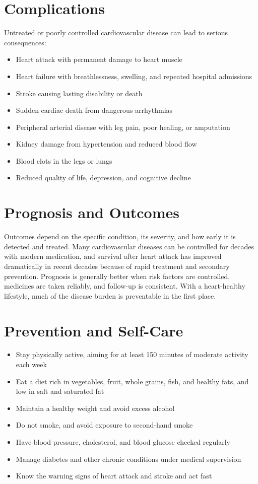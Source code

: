 \section*{Complications}
Untreated or poorly controlled cardiovascular disease can lead to serious consequences:
\begin{itemize}
    \item Heart attack with permanent damage to heart muscle
    \item Heart failure with breathlessness, swelling, and repeated hospital admissions
    \item Stroke causing lasting disability or death
    \item Sudden cardiac death from dangerous arrhythmias
    \item Peripheral arterial disease with leg pain, poor healing, or amputation
    \item Kidney damage from hypertension and reduced blood flow
    \item Blood clots in the legs or lungs
    \item Reduced quality of life, depression, and cognitive decline
\end{itemize}

\section*{Prognosis and Outcomes}
Outcomes depend on the specific condition, its severity, and how early it is detected and treated. Many cardiovascular diseases can be controlled for decades with modern medication, and survival after heart attack has improved dramatically in recent decades because of rapid treatment and secondary prevention. Prognosis is generally better when risk factors are controlled, medicines are taken reliably, and follow-up is consistent. With a heart-healthy lifestyle, much of the disease burden is preventable in the first place.

\section*{Prevention and Self-Care}
\begin{itemize}
    \item Stay physically active, aiming for at least 150 minutes of moderate activity each week
    \item Eat a diet rich in vegetables, fruit, whole grains, fish, and healthy fats, and low in salt and saturated fat
    \item Maintain a healthy weight and avoid excess alcohol
    \item Do not smoke, and avoid exposure to second-hand smoke
    \item Have blood pressure, cholesterol, and blood glucose checked regularly
    \item Manage diabetes and other chronic conditions under medical supervision
    \item Know the warning signs of heart attack and stroke and act fast
\end{itemize}

